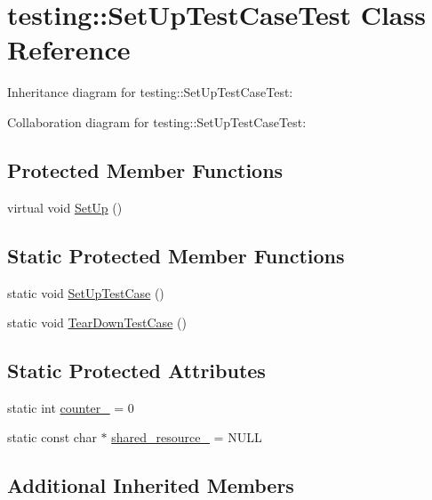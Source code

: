 \hypertarget{classtesting_1_1_set_up_test_case_test}{}\section{testing\+:\+:Set\+Up\+Test\+Case\+Test Class Reference}
\label{classtesting_1_1_set_up_test_case_test}


Inheritance diagram for testing\+:\+:Set\+Up\+Test\+Case\+Test\+:


Collaboration diagram for testing\+:\+:Set\+Up\+Test\+Case\+Test\+:
\subsection*{Protected Member Functions}
\begin{DoxyCompactItemize}
\item 
virtual void \hyperlink{classtesting_1_1_set_up_test_case_test_a4b44551ccf73e66de7ec95b2ab3b2085}{Set\+Up} ()
\end{DoxyCompactItemize}
\subsection*{Static Protected Member Functions}
\begin{DoxyCompactItemize}
\item 
static void \hyperlink{classtesting_1_1_set_up_test_case_test_a50732abc0bcb3725e6dfd6a2d487e944}{Set\+Up\+Test\+Case} ()
\item 
static void \hyperlink{classtesting_1_1_set_up_test_case_test_abdc133cd161ff2fa317f489da9bdccf3}{Tear\+Down\+Test\+Case} ()
\end{DoxyCompactItemize}
\subsection*{Static Protected Attributes}
\begin{DoxyCompactItemize}
\item 
static int \hyperlink{classtesting_1_1_set_up_test_case_test_a5b6e811128d35389be49f6569bf93817}{counter\+\_\+} = 0
\item 
static const char $\ast$ \hyperlink{classtesting_1_1_set_up_test_case_test_a904e77fd9a628b6a9aca0280665fd040}{shared\+\_\+resource\+\_\+} = N\+U\+LL
\end{DoxyCompactItemize}
\subsection*{Additional Inherited Members}


